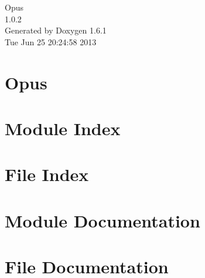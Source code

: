 \documentclass[letterpaper]{book}
\begin{document}
\hypersetup{pageanchor=false}
\begin{titlepage}
\vspace*{7cm}
\begin{center}
{\Large Opus \\[1ex]\large 1.0.2 }\\
\vspace*{1cm}
{\large Generated by Doxygen 1.6.1}\\
\vspace*{0.5cm}
{\small Tue Jun 25 20:24:58 2013}\\
\end{center}
\end{titlepage}
\clearemptydoublepage
{}
\tableofcontents
\clearemptydoublepage
{}
\hypersetup{pageanchor=true}
\chapter{Opus}
\label{index}\hypertarget{index}{}
\chapter{Module Index}

\chapter{File Index}

\chapter{Module Documentation}












\chapter{File Documentation}





\printindex
\end{document}
